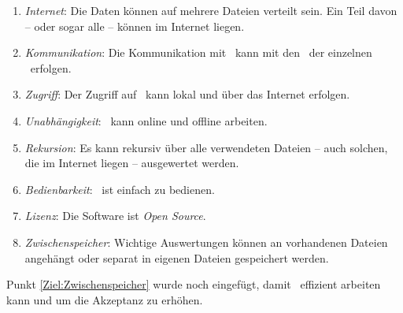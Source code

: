 \begin{enumerate}
	\item \label{Ziel:Internet} \emph{Internet}:
	Die Daten können auf mehrere Dateien verteilt sein.
	Ein Teil davon -- oder sogar alle -- können im Internet liegen.
	\item \label{Ziel:Kommunikation} \emph{Kommunikation}:
	Die Kommunikation mit \ASBA\ kann mit den \Fachbegriffen\ der einzelnen \Fachgebiete\ erfolgen.
	\item \label{Ziel:Zugriff} \emph{Zugriff}:
	Der Zugriff auf \ASBA\ kann lokal und über das Internet erfolgen.
	\item \label{Ziel:Unabhängigkeit} \emph{Unabhängigkeit}:
	\ASBA\ kann online und offline arbeiten.
	\item \label{Ziel:Rekursion} \emph{Rekursion}:
	Es kann rekursiv über alle verwendeten Dateien -- auch solchen, die im Internet liegen -- ausgewertet werden.
	\item \label{Ziel:Bedienbarkeit} \emph{Bedienbarkeit}:
	\ASBA\ ist einfach zu bedienen.
	\item \label{Ziel:Lizenz} \emph{Lizenz}:
	Die Software ist \emph{Open Source}.
	\item \label{Ziel:Zwischenspeicher} \emph{Zwischenspeicher}:
	Wichtige Auswertungen können an vorhandenen Dateien angehängt oder separat in eigenen Dateien gespeichert werden.
\end{enumerate}
%
Punkt \ref{Ziel:Zwischenspeicher} wurde noch eingefügt, damit \ASBA\ effizient arbeiten kann und um die Akzeptanz zu erhöhen.

